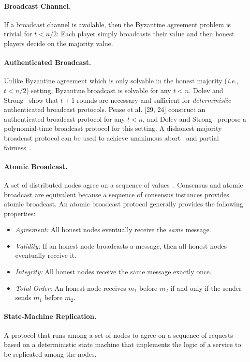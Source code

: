 \documentclass[11pt]{article}
\newcommand{\ie}{\textit{i.e.}}
\theoremstyle{mytheoremstyle}
\begin{document}
\paragraph{Broadcast Channel.} If a broadcast channel is available, then the Byzantine agreement problem is trivial for $t<n/2$: Each player simply broadcasts their value and then honest players decide on the majority value.

\paragraph{Authenticated Broadcast.} Unlike Byzantine agreement which is only solvable in the honest majority (\ie, $t<n/2$) setting, Byzantine broadcast is solvable for any $t < n$. Dolev and Strong~\cite{Dolev:Strong:83} show that $t + 1$ rounds are necessary and sufficient for \emph{deterministic} authenticated broadcast protocols. Pease et al. [29, 24] construct an authenticated broadcast protocol for any $t < n$, and Dolev and Strong~\cite{Dolev:Strong:83} propose a polynomial-time broadcast protocol for this setting. A dishonest majority broadcast protocol can be used to achieve unanimous abort~\cite{goldwasser:2002:mpcnoba} and partial fairness~\cite{gradwohl:2006}.

\paragraph{Atomic Broadcast.}
A set of distributed nodes agree on a sequence of values~\cite{AtomicBroadcast:1993}. Consensus and atomic broadcast are equivalent because a sequence of consensus instances provides atomic broadcast. An atomic broadcast protocol generally provides the following properties:
\begin{itemize}
	\item \textit{Agreement:} All honest nodes eventually receive the \emph{same} message.
	\item \textit{Validity:} If an honest node broadcasts a message, then all honest nodes eventually receive it.
	\item \textit{Integrity:} All honest nodes receive the same message exactly once.
	\item \textit{Total Order:} An honest node receives $m_1$ before $m_2$ if and only if the sender sends $m_1$ before $m_2$.
\end{itemize}

\paragraph{State-Machine Replication.}
A protocol that runs among a set of nodes to agree on a sequence of requests based on a deterministic state machine that implements the logic of a service to be replicated among the nodes.
\end{document}
